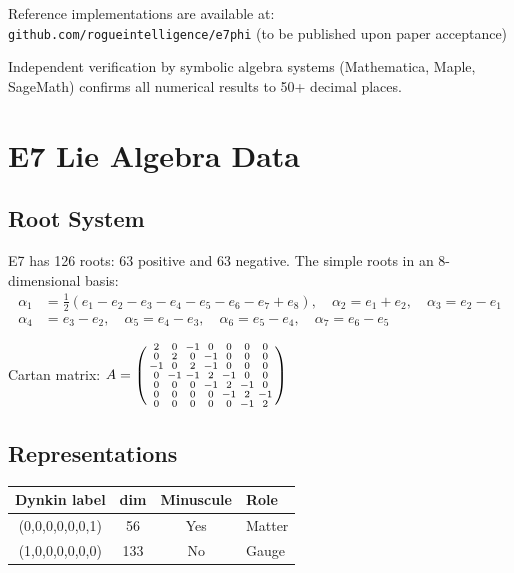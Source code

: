 \documentclass[11pt,a4paper]{article}
\begin{document}
Reference implementations are available at:\\
\texttt{github.com/rogueintelligence/e7phi} (to be published upon paper acceptance)

Independent verification by symbolic algebra systems (Mathematica, Maple, SageMath) confirms all numerical results to 50+ decimal places.

\appendix

\section{E7 Lie Algebra Data}
\label{app:e7-data}

\subsection{Root System}

E7 has 126 roots: 63 positive and 63 negative. The simple roots in an 8-dimensional basis:
\begin{align}
\alpha_1 &= \tfrac{1}{2}(e_1 - e_2 - e_3 - e_4 - e_5 - e_6 - e_7 + e_8), \quad
\alpha_2 = e_1 + e_2, \quad
\alpha_3 = e_2 - e_1 \\
\alpha_4 &= e_3 - e_2, \quad
\alpha_5 = e_4 - e_3, \quad
\alpha_6 = e_5 - e_4, \quad
\alpha_7 = e_6 - e_5
\end{align}

Cartan matrix:
$A = \begin{psmallmatrix}
2 & 0 & -1 & 0 & 0 & 0 & 0 \\
0 & 2 & 0 & -1 & 0 & 0 & 0 \\
-1 & 0 & 2 & -1 & 0 & 0 & 0 \\
0 & -1 & -1 & 2 & -1 & 0 & 0 \\
0 & 0 & 0 & -1 & 2 & -1 & 0 \\
0 & 0 & 0 & 0 & -1 & 2 & -1 \\
0 & 0 & 0 & 0 & 0 & -1 & 2
\end{psmallmatrix}$

\subsection{Representations}

\begin{center}
\begin{tabular}{|c|c|c|l|}
\hline
\textbf{Dynkin label} & \textbf{dim} & \textbf{Minuscule} & \textbf{Role} \\
\hline
(0,0,0,0,0,0,1) & 56 & Yes & Matter \\
(1,0,0,0,0,0,0) & 133 & No & Gauge \\
\hline
\end{tabular}
\end{center}
\end{document}
